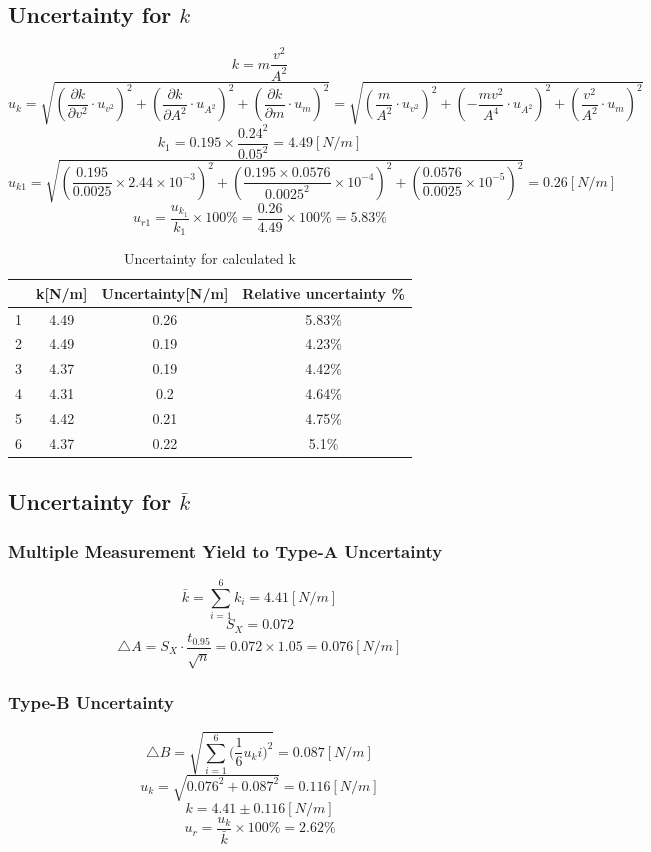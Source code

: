 \documentclass[12pt]{article}
\begin{document}
\subsection{Uncertainty for $k$}
$$k=m\frac{v^2}{A^2}$$
$$u_k=\sqrt{(\frac{\partial{k}}{\partial{v^2}}\cdot{u_{v^2}})^2+(\frac{\partial{k}}{\partial{A^2}}\cdot{u_{A^2}})^2+(\frac{\partial{k}}{\partial{m}}\cdot{u_m})^2}=\sqrt{(\frac{m}{A^2}\cdot{u_{v^2}})^2+(-\frac{mv^2}{A^4}\cdot{u_{A^2}})^2+(\frac{v^2}{A^2}\cdot{u_m})^2}$$
$$k_1=0.195\times\frac{0.24^2}{0.05^2}=4.49[N/m]$$
$$u_{k1}=\sqrt{(\frac{0.195}{0.0025}\times2.44\times10^{-3})^2+(\frac{0.195\times0.0576}{0.0025^2}\times10^{-4})^2+(\frac{0.0576}{0.0025}\times10^{-5})^2}=0.26[N/m]$$
$$u_{r1}=\frac{u_{k_1}}{k_1}\times100\%=\frac{0.26}{4.49}\times100\%=5.83\%$$
\begin{table}[]
\centering
\begin{tabular}{|c|c|c|c|}
\hline
  & k[N/m] & Uncertainty[N/m] & Relative uncertainty \% \\ \hline
1 & 4.49   & 0.26             & 5.83\%                     \\ \hline
2 & 4.49   & 0.19            & 4.23\%                     \\ \hline
3 & 4.37   & 0.19            & 4.42\%                     \\ \hline
4 & 4.31   & 0.2              & 4.64\%                     \\ \hline
5 & 4.42   & 0.21                 &4.75\%                    \\ \hline
6 & 4.37   & 0.22                 &5.1\%                      \\ \hline
\end{tabular}
\caption{Uncertainty for calculated k}
\end{table}
\subsection{Uncertainty for $\bar{k}$}
\subsubsection{Multiple Measurement Yield to Type-A Uncertainty}
$$\bar{k}=\sum_{i=1}^6{k_i}=4.41[N/m]$$
$$S_X=0.072$$
$$\bigtriangleup{A}=S_X\cdot\frac{t_{0.95}}{\sqrt{n}}=0.072\times1.05=0.076[N/m]$$
\subsubsection{Type-B Uncertainty}
$$\bigtriangleup{B}=\sqrt{\sum_{i=1}^6{(\frac{1}{6}u_ki})^2}=0.087[N/m]$$
$$u_k=\sqrt{0.076^2+0.087^2}=0.116[N/m]$$
$$k=4.41\pm0.116[N/m]$$
$$u_r=\frac{u_k}{\bar{k}}\times100\%=2.62\%$$
\end{document}
